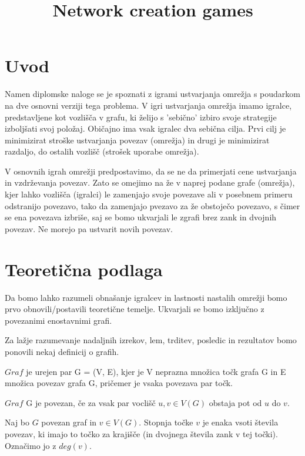 \documentclass[fin1, tisk]{fmfdelo}
\title{Network creation games}
\begin{document}
\section{Uvod}

Namen diplomske naloge se je spoznati z igrami ustvarjanja omrežja s poudarkom na dve osnovni verziji tega problema.
V igri ustvarjanja omrežja imamo igralce, predstavljene kot vozlišča v grafu, ki želijo s 'sebično' izbiro svoje
strategije izboljšati svoj položaj. Običajno ima vsak igralec dva sebična cilja. Prvi cilj je minimizirat stroške
ustvarjanja povezav (omrežja) in drugi je minimizirat razdaljo, do ostalih vozlišč (strošek uporabe omrežja).


V osnovnih igrah omrežji predpostavimo, da se ne da primerjati cene ustvarjanja in vzdrževanja povezav. Zato se
omejimo na že v naprej podane grafe (omrežja), kjer lahko vozlišča (igralci) le zamenjajo svoje povezave ali v
posebnem primeru odstranijo povezavo, tako da zamenjajo pvezavo za že obstoječo povezavo, s čimer se ena povezava
izbriše, saj se bomo ukvarjali le zgrafi brez zank in dvojnih povezav. Ne morejo pa ustvarit novih povezav.

\section{Teoretična podlaga}
Da bomo lahko razumeli obnašanje igralcev in lastnosti nastalih omrežji bomo prvo obnovili/postavili teoretične temelje. 
Ukvarjali se bomo izključno z povezanimi enostavnimi grafi.

Za lažje razumevanje nadaljnih izrekov, lem, trditev, posledic in rezultatov bomo ponovili nekaj definicij o grafih.

\begin{definicija}
$Graf$ je urejen par G = (V, E), kjer je V neprazna množica točk grafa G in E množica povezav grafa G, pričemer je vsaka povezava par točk.
\end{definicija}

\begin{definicija}
$Graf$ G je povezan, če za vsak par voclišč $u, v \in V(G)$ obstaja pot od $u$ do $v$.
\end{definicija}

\begin{definicija}
Naj bo $G$ povezan graf in $v \in V(G)$. Stopnja točke $v$ je enaka vsoti števila povezav, ki imajo to točko za krajišče (in dvojnega števila zank v tej točki).
Označimo jo z $deg(v)$.
\end{definicija}
\end{document}

